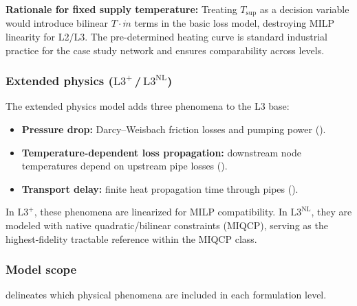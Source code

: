 \documentclass[review,3p]{elsarticle}
\newcommand{\Lplus}{\mathrm{L3}^{+}}
\newcommand{\Lnl}{\mathrm{L3}^{\mathrm{NL}}}
\begin{document}
\textbf{Rationale for fixed supply temperature:} Treating
$T_{\mathrm{sup}}$ as a decision variable would introduce bilinear
$T \cdot \dot{m}$ terms in the basic loss model, destroying MILP
linearity for L2/L3. The pre-determined heating curve is standard
industrial practice for the case study network and ensures
comparability across levels.

\subsubsection{Extended physics ($\Lplus$\,/\,$\Lnl$)}

The extended physics model adds three phenomena to the L3 base:
%
\begin{itemize}[nosep]
  \item \textbf{Pressure drop:} Darcy--Weisbach friction losses and
        pumping power ().
  \item \textbf{Temperature-dependent loss propagation:} downstream
        node temperatures depend on upstream pipe losses
        ().
  \item \textbf{Transport delay:} finite heat propagation time
        through pipes ().
\end{itemize}

In $\Lplus$, these phenomena are linearized for MILP compatibility.
In $\Lnl$, they are modeled with native quadratic/bilinear
constraints (MIQCP), serving as the highest-fidelity tractable
reference within the MIQCP class.

\subsubsection{Model scope}
\label{sec:model_scope}

 delineates which physical phenomena are
included in each formulation level.
\end{document}
